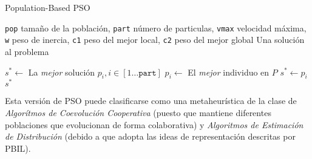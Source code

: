 \begin{algorithm}
\caption{Population-Based PSO}
\label{pbpso-alg}
\begin{algorithmic}[1]

\Require \texttt{pop} tamaño de la población,
	\texttt{part} número de particulas,
	\texttt{vmax} velocidad máxima,
	\texttt{w} peso de inercia,
	\texttt{c1} peso del mejor local,
	\texttt{c2} peso del mejor global
\Ensure Una solución al problema

\EndFor
\State $s^* \gets$ La \emph{mejor} solución $p_i, i \in [1 \dots \texttt{part}]$
			\State $p_i \gets$ El \emph{mejor} individuo en $P$
				\State $s^* \gets p_i$
			\EndIf
		\EndIf
	\EndFor
\EndWhile
\State \Return $s^*$

\end{algorithmic}
\end{algorithm}

Esta versión de PSO puede clasificarse como una metaheurística de la clase de \emph{Algorítmos de Coevolución Cooperativa} \cite{Derrac:2009:FSU:1574827.1574906} (puesto que mantiene diferentes poblaciones que evolucionan de forma colaborativa) y \emph{Algoritmos de Estimación de Distribución} (debido a que adopta las ideas de representación descritas por PBIL).
